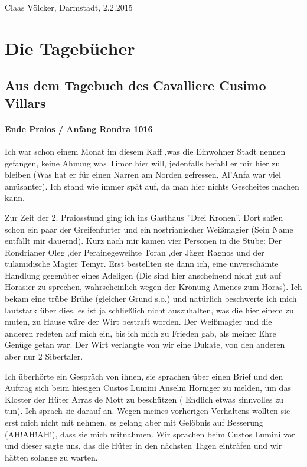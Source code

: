 \begin{flushright}
Claas Völcker, Darmstadt, 2.2.2015
\end{flushright}



\section{Die Tagebücher}


\subsection{Aus dem Tagebuch des Cavalliere Cusimo Villars}

\paragraph{Ende Praios / Anfang Rondra 1016}
Ich war schon einem Monat im diesem Kaff ,was die Einwohner Stadt nennen gefangen, keine Ahnung was Timor hier will, jedenfalls befahl er mir hier zu bleiben (Was hat er für einen Narren am Norden gefressen, Al'Anfa war viel amüsanter).
Ich stand wie immer spät auf, da man hier nichts Gescheites machen kann.

Zur Zeit der 2. Praiosstund ging ich ins Gasthaus ''Drei Kronen''. Dort saßen schon ein paar der Greifenfurter und ein nostrianischer Weißmagier (Sein Name entfällt mir dauernd). Kurz nach mir kamen vier Personen in die Stube: Der Rondrianer Oleg ,der Perainegeweihte Toran ,der Jäger Ragnos und der tulamidische Magier Temyr. Erst bestellten sie dann ich, eine unverschämte Handlung gegenüber eines Adeligen (Die sind hier anscheinend nicht gut auf Horasier zu sprechen, wahrscheinlich wegen der Krönung Amenes zum Horas). Ich bekam eine trübe Brühe (gleicher Grund s.o.) und natürlich beschwerte ich mich lautstark über dies, es ist ja schließlich nicht auszuhalten, was die hier einem zu muten, zu Hause wäre der Wirt bestraft worden. Der Weißmagier und die anderen redeten auf mich ein, bis ich mich zu Frieden gab, als meiner Ehre Genüge getan war. Der Wirt verlangte von wir eine Dukate, von den anderen aber nur 2 Sibertaler.

Ich überhörte ein Gespräch von ihnen, sie sprachen über einen Brief und den Auftrag sich beim hiesigen Custos Lumini Anselm Horniger zu melden, um das Kloster der Hüter Arras de Mott zu beschützen ( Endlich etwas sinnvolles zu tun). Ich sprach sie darauf an. Wegen meines vorherigen Verhaltens wollten sie erst mich nicht mit nehmen, es gelang aber mit Gelöbnis auf Besserung (AH!AH!AH!), dass sie mich mitnahmen. Wir sprachen beim Custos Lumini vor und dieser sagte uns, das die Hüter in den nächsten Tagen einträfen und wir hätten solange zu warten.


